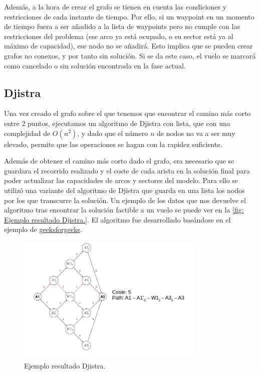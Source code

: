 Además, a la hora de crear el grafo se tienen en cuenta las condiciones y restricciones de cada instante de tiempo. Por ello, si un waypoint en un momento de tiempo fuera a ser añadido a la lista de waypoints pero no cumple con las restricciones del problema (ese arco ya está ocupado, o su sector está ya al máximo de capacidad), ese nodo no se añadirá. Esto implica que se pueden crear grafos no conexos, y por tanto sin solución. Si se da este caso, el vuelo se marcará como cancelado o sin solución encontrada en la fase actual.

\subsection{Djistra}
Una vez creado el grafo sobre el que tenemos que encontrar el camino más corto entre 2 puntos, ejecutamos un algoritmo de Djistra con lista, que con una complejidad de $O(n^{2})$, y dado que el número $n$ de nodos no va a ser muy elevado, permite que las operaciones se hagan con la rapidez suficiente.

Además de obtener el camino más corto dado el grafo, era necesario que se guardara el recorrido realizado y el coste de cada arista en la solución final para poder actualizar las capacidades de arcos y sectores del modelo. Para ello se utilizó una variante del algoritmo de Djistra que guarda en una lista los nodos por los que transcurre la solución. Un ejemplo de los datos que nos devuelve el algoritmo tras encontrar la solución factible a un vuelo se puede ver en la \autoref{fig: Ejemplo resultado Djistra.}. El algoritmo fue desarrollado basándose en el ejemplo de \href{http://www.geeksforgeeks.org/printing-paths-dijkstras-shortest-path-algorithm/}{geeksforgeeks}.

\begin{figure}[]
	\begin{center}
		\centering
		\includegraphics[width=0.8\textwidth]{./imagenes/heuristico/recorrido.jpg}
			\caption{Ejemplo resultado Djistra.}
			\label{fig: Ejemplo resultado Djistra.}
	\end{center}
\end{figure}

